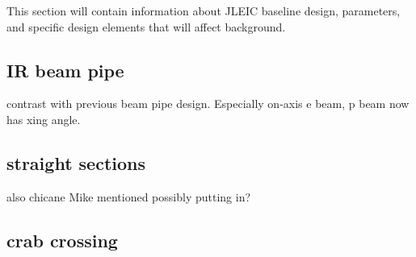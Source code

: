 This section will contain information about JLEIC baseline design, parameters, and specific design elements that will affect background.  
\subsection{IR beam pipe}
contrast with previous beam pipe design.  Especially on-axis e beam, p beam now has xing angle.  
\subsection{straight sections}
also chicane Mike mentioned possibly putting in?
\subsection{crab crossing}
